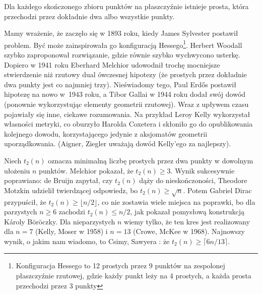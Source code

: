 \begin{theorem}
	Dla każdego skończonego zbioru punktów na płaszczyźnie istnieje prosta, która przechodzi przez dokładnie dwa albo wszystkie punkty.
\end{theorem}

Mamy wrażenie, że zaczęło się w 1893 roku, kiedy James Sylvester postawił problem.
%
Być może zainspirowała go konfiguracją Hessego\footnote{Konfiguracja Hessego to 12 prostych przez 9 punktów na zespolonej płaszczyźnie rzutowej, gdzie każdy punkt leży na 4 prostych, a każda prosta przechodzi przez 3 punkty}.
%
Herbert Woodall szybko zaproponował rozwiązanie, gdzie równie szybko wychwycono usterkę.
%
Dopiero w 1941 roku Eberhard Melchior udowodnił trochę mocniejsze stwierdzenie niż rzutowy dual ówczesnej hipotezy (że prostych przez dokładnie dwa punkty jest co najmniej trzy).
%
Nieświadomy tego, Paul Erdős postawił hipotezę na nowo w~1943 roku, a Tibor Gallai w 1944 roku dodał swój dowód (ponownie wykorzystując elementy geometrii rzutowej).
%
%
Wraz z upływem czasu pojawiały się inne, ciekawe rozumowania.
Na przykład Leroy Kelly wykorzystał własności metryki, co oburzyło Harolda Coxetera \cite[s. 199-201]{coxeter_1967} i skłoniło go do opublikowania kolejnego dowodu, korzystającego jedynie z aksjomatów geometrii uporządkowania.
%
%
(Aigner, Ziegler uważają dowód Kelly'ego za najlepszy).

Niech $t_2(n)$ oznacza minimalną liczbę prostych przez dwa punkty w dowolnym ułożeniu $n$ punktów.
Melchior pokazał, że $t_2(n) \ge 3$.
Wynik sukcesywnie poprawiano:
de Bruijn \cite{debruijn_1948} zapytał, czy $t_2(n)$ dąży do nieskończoności,
%
Theodore Motzkin \cite{motzkin_1951} udzielił twierdzącej odpowiedz, bo $t_2(n) \ge \sqrt{n}$.
%
Potem Gabriel Dirac \cite{dirac_1951} przypuścił, że $t_2(n) \ge \lfloor n/2\rfloor$, co nie zostawia wiele miejsca na poprawki, bo dla parzystych $n \ge 6$ zachodzi $t_2(n) \le n/2$, jak pokazał pomysłową konstrukcją Károly Böröczky.
%
%
Dla nieparzystych $n$ wiemy tylko, że ten kres jest realizowany dla $n = 7$ (Kelly, Moser \cite{kelly_1958} w 1958) i $n = 13$ (Crowe, McKee \cite{mckee_1968} w 1968).
%
%
%
Najnowszy wynik, o jakim nam wiadomo, to Csimy, Sawyera \cite{csima_1993}: że $t_2(n) \ge \lceil 6n/13 \rceil$.
%
%
